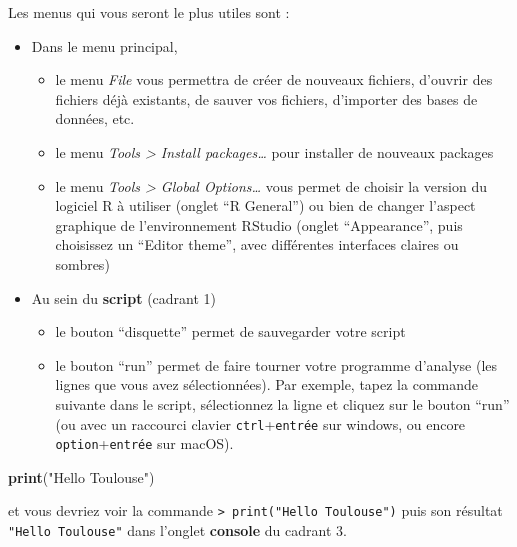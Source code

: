 \documentclass[
]{book}
\newenvironment{Shaded}{\begin{snugshade}}{\end{snugshade}}
\newcommand{\FunctionTok}[1]{\textcolor[rgb]{0.13,0.29,0.53}{\textbf{#1}}}
\newcommand{\NormalTok}[1]{#1}
\newcommand{\StringTok}[1]{\textcolor[rgb]{0.31,0.60,0.02}{#1}}
\providecommand{\tightlist}{%
  \setlength{\itemsep}{0pt}\setlength{\parskip}{0pt}}
\begin{document}
Les menus qui vous seront le plus utiles sont :

\begin{itemize}
\tightlist
\item
  Dans le menu principal,

  \begin{itemize}
  \tightlist
  \item
    le menu \emph{File} vous permettra de créer de nouveaux fichiers, d'ouvrir des fichiers déjà existants, de sauver vos fichiers, d'importer des bases de données, etc.
  \item
    le menu \emph{Tools \textgreater{} Install packages\ldots{}} pour installer de nouveaux packages
  \item
    le menu \emph{Tools \textgreater{} Global Options\ldots{}} vous permet de choisir la version du logiciel R à utiliser (onglet ``R General'') ou bien de changer l'aspect graphique de l'environnement RStudio (onglet ``Appearance'', puis choisissez un ``Editor theme'', avec différentes interfaces claires ou sombres)
  \end{itemize}
\item
  Au sein du \textbf{script} (cadrant 1)

  \begin{itemize}
  \tightlist
  \item
    le bouton ``disquette'' permet de sauvegarder votre script
  \item
    le bouton ``run'' permet de faire tourner votre programme d'analyse (les lignes que vous avez sélectionnées). Par exemple, tapez la commande suivante dans le script, sélectionnez la ligne et cliquez sur le bouton ``run'' (ou avec un raccourci clavier \texttt{ctrl}+\texttt{entrée} sur windows, ou encore \texttt{option}+\texttt{entrée} sur macOS).
  \end{itemize}
\end{itemize}

\begin{Shaded}
\begin{Highlighting}[]
\FunctionTok{print}\NormalTok{(}\StringTok{"Hello Toulouse"}\NormalTok{)}
\end{Highlighting}
\end{Shaded}

et vous devriez voir la commande \texttt{\textgreater{}\ print("Hello\ Toulouse")} puis son résultat \texttt{"Hello\ Toulouse"} dans l'onglet \textbf{console} du cadrant 3.
\end{document}
